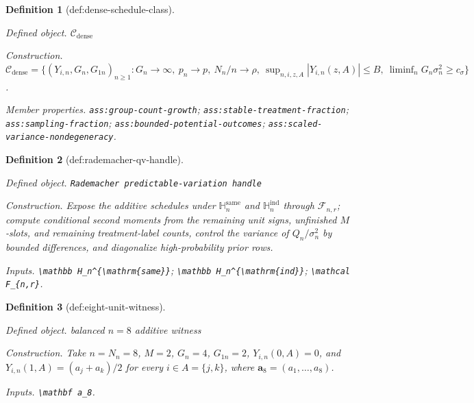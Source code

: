 \documentclass{article}
\newtheorem{definition}{Definition}
\begin{document}
\begin{definition}[def:dense-schedule-class]\label{def:dense-schedule-class}
\par\smallskip\noindent\emph{Defined object.} \(\mathcal C_{\mathrm{dense}}\)
\par\smallskip\noindent\emph{Construction.} \(\mathcal C_{\mathrm{dense}}=\{(Y_{i,n},G_n,G_{1n})_{n\ge1}:G_n\to\infty,\ p_n\to p,\ N_n/n\to\rho,\ \sup_{n,i,z,A}|Y_{i,n}(z,A)|\le B,\ \liminf_nG_n\sigma_n^2\ge c_\sigma\}\).
\par\smallskip\noindent\emph{Member properties.} \texttt{ass:\allowbreak{}group-\allowbreak{}count-\allowbreak{}growth}; \texttt{ass:\allowbreak{}stable-\allowbreak{}treatment-\allowbreak{}fraction}; \texttt{ass:\allowbreak{}sampling-\allowbreak{}fraction}; \texttt{ass:\allowbreak{}bounded-\allowbreak{}potential-\allowbreak{}outcomes}; \texttt{ass:\allowbreak{}scaled-\allowbreak{}variance-\allowbreak{}nondegeneracy}.
\end{definition}

\begin{definition}[def:rademacher-qv-handle]\label{def:rademacher-qv-handle}
\par\smallskip\noindent\emph{Defined object.} \texttt{Rademacher predictable-\allowbreak{}variation handle}
\par\smallskip\noindent\emph{Construction.} Expose the additive schedules under \(\mathbb H_n^{\mathrm{same}}\) and \(\mathbb H_n^{\mathrm{ind}}\) through \(\mathcal F_{n,r}\); compute conditional second moments from the remaining unit signs, unfinished \(M\)-slots, and remaining treatment-label counts, control the variance of \(Q_n/\sigma_n^2\) by bounded differences, and diagonalize high-probability prior rows.
\par\smallskip\noindent\emph{Inputs.} \texttt{\textbackslash{}\allowbreak{}mathbb H\_\allowbreak{}n\textasciicircum{}\{\textbackslash{}\allowbreak{}mathrm\{same\}\allowbreak{}\}\allowbreak{}}; \texttt{\textbackslash{}\allowbreak{}mathbb H\_\allowbreak{}n\textasciicircum{}\{\textbackslash{}\allowbreak{}mathrm\{ind\}\allowbreak{}\}\allowbreak{}}; \texttt{\textbackslash{}\allowbreak{}mathcal F\_\allowbreak{}\{n,\allowbreak{}r\}\allowbreak{}}.
\end{definition}

\begin{definition}[def:eight-unit-witness]\label{def:eight-unit-witness}
\par\smallskip\noindent\emph{Defined object.} balanced \(n=8\) additive witness
\par\smallskip\noindent\emph{Construction.} Take \(n=N_n=8\), \(M=2\), \(G_n=4\), \(G_{1n}=2\), \(Y_{i,n}(0,A)=0\), and \(Y_{i,n}(1,A)=(a_j+a_k)/2\) for every \(i\in A=\{j,k\}\), where \(\mathbf a_8=(a_1,\ldots,a_8)\).
\par\smallskip\noindent\emph{Inputs.} \texttt{\textbackslash{}\allowbreak{}mathbf a\_\allowbreak{}8}.
\end{definition}
\end{document}
